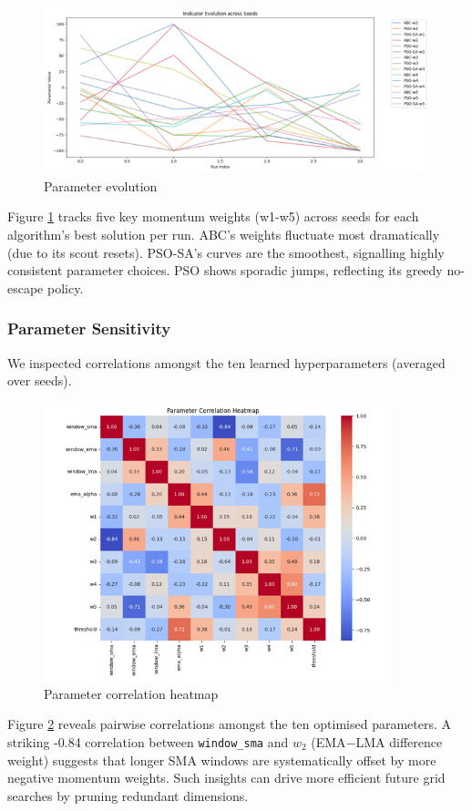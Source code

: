 \documentclass[a4paper, 12pt]{extarticle}
\begin{document}
\begin{figure}[h!]
    \centering
    \includegraphics[width=\textwidth]{./assets/parameter_weights.png}
    \caption{Parameter evolution}
    \label{fig:parameter}
\end{figure}
Figure \ref{fig:parameter} tracks five key momentum weights (w1-w5) across seeds for each algorithm's best solution per run. ABC's weights fluctuate most dramatically (due to its scout resets). PSO-SA's curves are the smoothest, signalling highly consistent parameter choices. PSO shows sporadic jumps, reflecting its greedy no-escape policy. 

\subsubsection{Parameter Sensitivity}
We inspected correlations amongst the ten learned hyperparameters (averaged over seeds).
\begin{figure}[h!]
    \centering
    \includegraphics[width=0.9\textwidth]{./assets/sensitivity.png}
    \caption{Parameter correlation heatmap}
    \label{fig:sensitivity}
\end{figure}
Figure \ref{fig:sensitivity} reveals pairwise correlations amongst the ten optimised parameters. A striking -0.84 correlation between \texttt{window\_sma} and $w_2$ (EMA$-$LMA difference weight) suggests that longer SMA windows are systematically offset by more negative momentum weights. Such insights can drive more efficient future grid searches by pruning redundant dimensions. 
\end{document}
